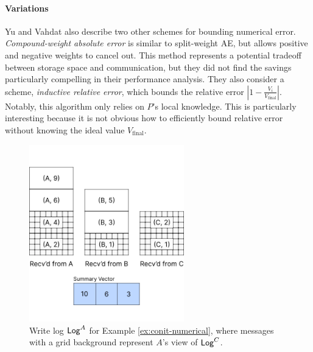 \documentclass[]             %
{NASA}                       %
\theoremstyle{definition}
\begin{document}
\paragraph{Variations} Yu and Vahdat also describe two other schemes
for bounding numerical error. \emph{Compound-weight absolute error} is
similar to split-weight AE, but allows positive and negative weights
to cancel out. This method represents a potential tradeoff between
storage space and communication, but they did not find the savings
particularly compelling in their performance analysis. They also
consider a scheme, \emph{inductive relative error}, which bounds the
relative error $|1 - \frac{V_i}{V_{\textrm{final}}}|$. Notably, this
algorithm only relies on $P$'s local knowledge. This is particularly
interesting because it is not obvious how to efficiently bound
relative error without knowing the ideal value $V_{\textrm{final}}$.

\begin{figure}
  \centering
  \includegraphics[width=0.6\textwidth]{images/conit/Numerical1.png}
  \caption{Write log $\mathsf{Log}^{A}$ for Example \ref{ex:conit-numerical}, where
    messages with a grid background represent $A$'s view of $\mathsf{Log}^{C}$.}
  \label{fig:conit-numerical}
\end{figure}
\end{document}
